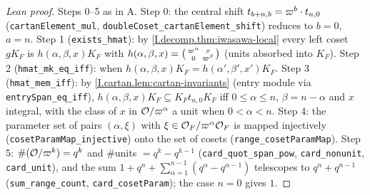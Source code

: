 \begin{proof}[Lean proof]
Steps 0--5 as in A. Step 0: the central shift $t_{b+n,b}=\varpi^b\cdot t_{n,0}$ (\texttt{cartanElement\_mul}, \texttt{doubleCoset\_cartanElement\_shift}) reduces to $b=0$, $a=n$. Step 1 (\texttt{exists\_hmat}): by \cref{I.decomp.thm:iwasawa-local} every left coset $gK_F$ is $h(\alpha,\beta,x)K_F$ with $h(\alpha,\beta,x)=\begin{psmallmatrix}\varpi^\alpha&x\\0&\varpi^\beta\end{psmallmatrix}$ (units absorbed into $K_F$). Step 2 (\texttt{hmat\_mk\_eq\_iff}): when $h(\alpha,\beta,x)K_F=h(\alpha',\beta',x')K_F$. Step 3 (\texttt{hmat\_mem\_iff}): by \cref{I.cartan.lem:cartan-invariants} (entry module via \texttt{entrySpan\_eq\_iff}), $h(\alpha,\beta,x)K_F\subseteq K_Ft_{n,0}K_F$ iff $0\le\alpha\le n$, $\beta=n-\alpha$ and $x$ integral, with the class of $x$ in $\mathcal{O}/\varpi^\alpha$ a unit when $0<\alpha<n$. Step 4: the parameter set of pairs $(\alpha,\xi)$ with $\xi\in\mathcal{O}_F/\varpi^\alpha\mathcal{O}_F$ is mapped injectively (\texttt{cosetParamMap\_injective}) onto the set of cosets (\texttt{range\_cosetParamMap}). Step 5: $\#(\mathcal{O}/\varpi^k)=q^k$ and $\#$units $=q^k-q^{k-1}$ (\texttt{card\_quot\_span\_pow}, \texttt{card\_nonunit}, \texttt{card\_unit}), and the sum $1+q^n+\sum_{\alpha=1}^{n-1}(q^\alpha-q^{\alpha-1})$ telescopes to $q^n+q^{n-1}$ (\texttt{sum\_range\_count}, \texttt{card\_cosetParam}); the case $n=0$ gives $1$.
\end{proof}


